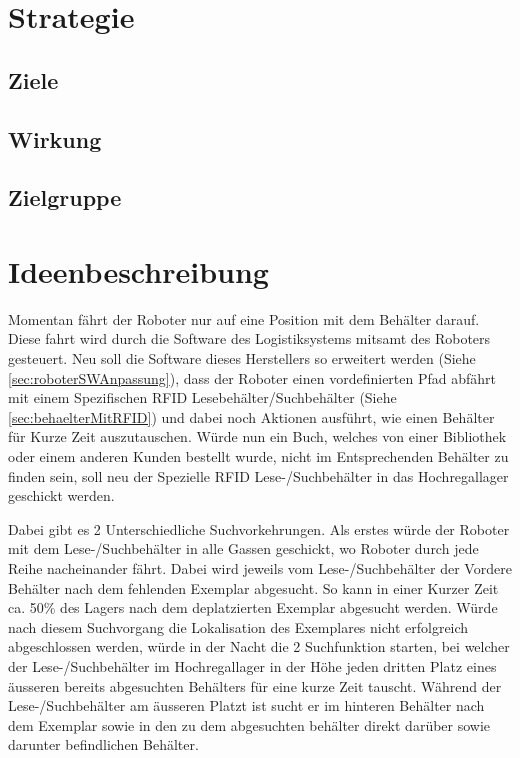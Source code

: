 \chapter{Strategie}

\section{Ziele}

\section{Wirkung}

\section{Zielgruppe}

\chapter{Ideenbeschreibung}
Momentan fährt der Roboter nur auf eine Position mit dem Behälter darauf. Diese fahrt wird durch die Software des Logistiksystems mitsamt des Roboters gesteuert. Neu soll die Software dieses Herstellers so erweitert werden (Siehe \ref{sec:roboterSWAnpassung}), dass der Roboter einen vordefinierten Pfad abfährt mit einem Spezifischen RFID Lesebehälter/Suchbehälter (Siehe \ref{sec:behaelterMitRFID}) und dabei noch Aktionen ausführt, wie einen Behälter für Kurze Zeit auszutauschen.
Würde nun ein Buch, welches von einer Bibliothek oder einem anderen Kunden bestellt wurde, nicht im Entsprechenden Behälter zu finden sein, soll neu der Spezielle RFID Lese-/Suchbehälter in das Hochregallager geschickt werden.


Dabei gibt es 2 Unterschiedliche Suchvorkehrungen. Als erstes würde der Roboter mit dem Lese-/Suchbehälter in alle Gassen geschickt, wo Roboter durch jede Reihe nacheinander fährt. Dabei wird jeweils vom Lese-/Suchbehälter der Vordere Behälter nach dem fehlenden Exemplar abgesucht. So kann in einer Kurzer Zeit ca. 50\% des Lagers nach dem deplatzierten Exemplar abgesucht werden. Würde nach diesem Suchvorgang die Lokalisation des Exemplares nicht erfolgreich abgeschlossen werden, würde in der Nacht die 2 Suchfunktion starten, bei welcher der Lese-/Suchbehälter im Hochregallager in der Höhe jeden dritten Platz eines äusseren bereits abgesuchten Behälters für eine kurze Zeit tauscht. Während der Lese-/Suchbehälter am äusseren Platzt ist sucht er im hinteren Behälter nach dem Exemplar sowie in den zu dem abgesuchten behälter direkt darüber sowie darunter befindlichen Behälter.

